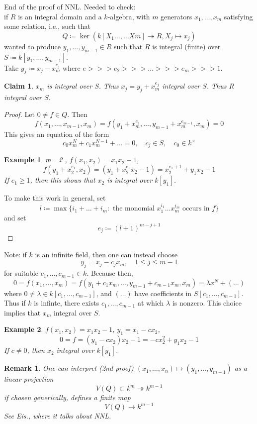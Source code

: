 \documentclass[12pt]{article}
\newtheorem{remark}[theorem]{Remark}
\newtheorem*{claim}{Claim}
\newtheorem*{eg}{Example}
\theoremstyle{definition}
\begin{document}
\date{08.11.2018}
End of the proof of NNL. Needed to check:\\
if $R$ is an integral domain and a $k$-algebra, with $m$ generators $x_1,\dots, x_m$ satisfying some relation, i.e., such that 
\[
Q\coloneqq \ker(k[X_1\dots, \dots Xm]\twoheadrightarrow R, X_j\mapsto x_j)
\]
wanted to produce $y_1,\dots, y_{m-1} \in R$ such that $R$ is integral (finite) over $S \coloneqq k[y_1,\dots, y_{m-1}]$.\\
Take $y_{j} \coloneqq x_j-x_m^{e_j}$ where $e>>> e_2>>> \dots >>> e_m>>> 1$.
\begin{claim}
$x_m$ is integral over $S$. Thus $x_j = y_j+x_m^{e_j}$ integral over $S$. Thus $R$ integral over $S$.
\end{claim}
\begin{proof}
Let $0\neq f \in Q$. Then 
\[
f(x_1,\dots, x_{m-1},x_m) = f(y_1+x_m^{e_1},\dots, y_{m-1}+x_m^{e_{m-1}},x_m) = 0
\]
This gives an equation of the form
\[
c_0x_m^N + c_1x_m^{N-1}+\dots = 0, \quad c_j\in S, \quad c_0\in k^\times
\]
\begin{eg}
m= 2 , $f(x_1,x_2)=x_1x_2-1$, 
\[
f(y_1+x_2^{e_1},x_2) = (y_1+x_2^{e_1}x_2-1) = x_2^{e_1+1}+y_1x_2-1
\]
If $e_1 \geq 1$, then this shows that $x_2$ is integral over $k[y_1]$.
\end{eg}
To make this work in general, set
\[
l\coloneqq \max \{i_1+\dots + i_m : \text{ the monomial $x_1^{i_1}\dots x_m^{i_m}$ occurs in }f\}
\]
and set
\[
e_j \coloneqq (l+1)^{m-j+1}
\]
\end{proof}
Note: if $k$ is an infinite field, then one can instead choose 
\[
y_j = x_j-c_jx_m, \quad 1\leq j\leq m-1
\]
for suitable $c_1,\dots ,c_{m-1}\in k $. Because then, 
\[
0 = f(x_1,\dots,x_m) = f(y_1+c_1x_m,\dots, y_{m-1}+c_{m-1}x_m,x_m) = \lambda x^N + (\dots)
\]
where $0\neq \lambda\in k[c_1,\dots, c_{m-1}]$, and $(\dots)$ have coefficients in $S[c_1,\dots, c_{m-1}]$. Thus if $k$ is infinte, there exists $c_1,\dots, c_{m-1}$ at which $\lambda$ is nonzero. This choice implies that $x_m$ integral over $S$.
\begin{eg}
$f(x_1,x_2) = x_1x_2-1$, $y_1=x_1-cx_2$,
\[
0 = f =(y_1-cx_2)x_2 - 1 = -cx_2^2 + y_1x_2 -1
\]
If $c\neq 0 $, then $x_2$ integral over $k[y_1]$.
\end{eg}
\begin{remark}
One can interpret (2nd proof) $(x_1,\dots, x_n) \mapsto (y_1,\dots, y_{m-1})$ as a linear projection
\[
V(Q) \subset k^m \twoheadrightarrow k^{m-1}
\]
if chosen generically, defines a finite map 
\[
V(Q) \rightarrow k^{m-1}
\]
See Eis., where it talks about NNL.
\end{remark}
\end{document}
